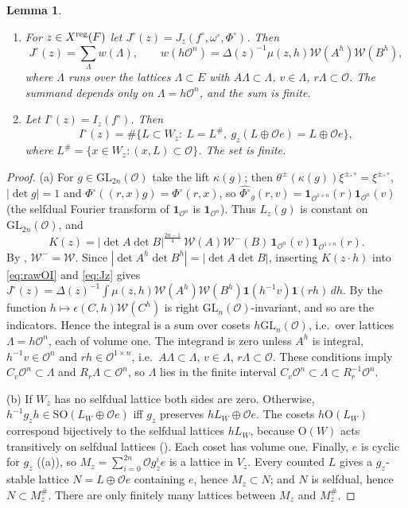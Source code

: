 \documentclass[11pt,oneside,notitlepage]{book}
\numberwithin{equation}{section}
\theoremstyle{plain}
\newtheorem{lemma}[theorem]{Lemma}
\theoremstyle{definition}
\newcommand{\cO}{\mathcal{O}}
\newcommand{\GL}{\mathrm{GL}}
\newcommand{\SO}{\mathrm{SO}}
\newcommand{\Ort}{\mathrm{O}}
\newcommand{\cW}{\mathcal{W}}
\newcommand{\one}{\mathbf{1}}
\begin{document}
\begin{lemma}\label{lem:basic}
\begin{enumerate}[label=(\alph*)]
\item For $z\in X^{\rm reg}(F)$ let $J^\circ(z)=J_z(f^\circ,\omega^\circ,\Phi^\circ)$. Then
\[J^\circ(z)=\sum_{\Lambda}w(\Lambda),\qquad w(h\cO^n)=\Delta(z)^{-1}\mu(z,h)\cW(A^h)\cW(B^h),\]
where $\Lambda$ runs over the lattices $\Lambda\subset E$ with $A\Lambda\subset\Lambda$, $v\in\Lambda$, $r\Lambda\subset\cO$. The summand depends only on $\Lambda=h\cO^n$, and the sum is finite.
\item Let $I^\circ(z)=I_z(f^\circ)$. Then
\[I^\circ(z)=\#\{L\subset W_z:\ L=L^\#,\ g_z(L\oplus\cO e)=L\oplus\cO e\},\]
where $L^\#=\{x\in W_z:(x,L)\subset\cO\}$. The set is finite.
\end{enumerate}
\end{lemma}
\begin{proof}
(a) For $g\in\GL_{2n}(\cO)$ take the lift $\kappa(g)$; then $\theta^\pm(\kappa(g))\xi^{\pm,\circ}=\xi^{\pm,\circ}$, $|\det g|=1$ and $\Phi^\circ((r,x)g)=\Phi^\circ(r,x)$, so $\widehat{\Phi^\circ}_g(r,v)=\one_{\cO^{1\times n}}(r)\one_{\cO^n}(v)$ (the selfdual Fourier transform of $\one_{\cO^{n}}$ is $\one_{\cO^n}$). Thus $L_z(g)$ is constant on $\GL_{2n}(\cO)$, and
\[K(z)=|\det A\det B|^{\frac{2n-1}4}\,\cW(A)\cW^-(B)\,\one_{\cO^n}(v)\one_{\cO^{1\times n}}(r).\]
By , $\cW^-=\cW$. Since $|\det A^h\det B^h|=|\det A\det B|$, inserting $K(z\cdot h)$ into \eqref{eq:rawOI} and \eqref{eq:Jz} gives $J^\circ(z)=\Delta(z)^{-1}\int\mu(z,h)\cW(A^h)\cW(B^h)\one(h^{-1}v)\one(rh)\,dh$. By  the function $h\mapsto\epsilon(C,h)\cW(C^h)$ is right $\GL_n(\cO)$-invariant, and so are the indicators. Hence the integral is a sum over cosets $h\GL_n(\cO)$, i.e.\ over lattices $\Lambda=h\cO^n$, each of volume one. The integrand is zero unless $A^h$ is integral, $h^{-1}v\in\cO^n$ and $rh\in\cO^{1\times n}$, i.e.\ $A\Lambda\subset\Lambda$, $v\in\Lambda$, $r\Lambda\subset\cO$. These conditions imply $C_v\cO^n\subset\Lambda$ and $R_r\Lambda\subset\cO^n$, so $\Lambda$ lies in the finite interval $C_v\cO^n\subset\Lambda\subset R_r^{-1}\cO^n$.

(b) If $W_z$ has no selfdual lattice both sides are zero. Otherwise, $h^{-1}g_zh\in\SO(L_W\oplus\cO e)$ iff $g_z$ preserves $hL_W\oplus\cO e$. The cosets $h\Ort(L_W)$ correspond bijectively to the selfdual lattices $hL_W$, because $\Ort(W)$ acts transitively on selfdual lattices (). Each coset has volume one. Finally, $e$ is cyclic for $g_z$ ((a)), so $M_z=\sum_{i=0}^{2n}\cO g_z^ie$ is a lattice in $V_z$. Every counted $L$ gives a $g_z$-stable lattice $N=L\oplus\cO e$ containing $e$, hence $M_z\subset N$; and $N$ is selfdual, hence $N\subset M_z^\#$. There are only finitely many lattices between $M_z$ and $M_z^\#$.
\end{proof}
\end{document}
